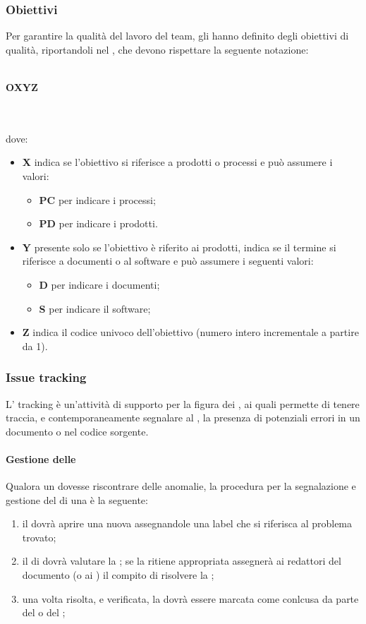 \subsubsection{Obiettivi}
Per garantire la qualità del lavoro del team, gli \AMMP{} hanno definito degli obiettivi di qualità,
riportandoli nel \PQdoc, che devono rispettare la seguente notazione:\\ \\
\centerline{\textbf{O\textbraceleft{}X\textbraceright{}\textbraceleft{}Y\textbraceright{}\textbraceleft{}Z\textbraceright{}}} \\ \\
dove: 
\begin{itemize}
	\item \textbf{X} indica se l'obiettivo si riferisce a prodotti o processi e può assumere i valori:
	\begin{itemize}
		\item \textbf{PC} per indicare i processi;
		\item \textbf{PD} per indicare i prodotti.
	\end{itemize}
	\item \textbf{Y} presente solo se l'obiettivo è riferito ai prodotti, indica se il termine  si riferisce a documenti o al software e può assumere i seguenti valori:
	\begin{itemize}
		\item \textbf{D} per indicare i documenti;
		\item \textbf{S} per indicare il software;
	\end{itemize}
	\item \textbf{Z} indica il codice univoco dell'obiettivo (numero intero incrementale a partire da 1).
\end{itemize}
\subsubsection{Issue tracking}
L' tracking è un'attività di supporto per la figura dei \VERP, ai quali permette di tenere traccia, e contemporaneamente segnalare al \RESP, la presenza di potenziali errori in un documento o nel codice sorgente.
 \paragraph{Gestione delle }
Qualora un \VER{} dovesse riscontrare delle anomalie, la procedura per la segnalazione e gestione del  di una  è la seguente:
\begin{enumerate}
	\item il \VER{} dovrà aprire una nuova  assegnandole una label che si riferisca al problema trovato;
	\item il \RESP{} di  dovrà valutare la ; se la ritiene appropriata assegnerà ai redattori del documento (o ai \PRP) il compito di risolvere la ;
	\item una volta risolta, e verificata, la  dovrà essere marcata come conlcusa da parte del \RESP{} o del \VER;
\end{enumerate}
